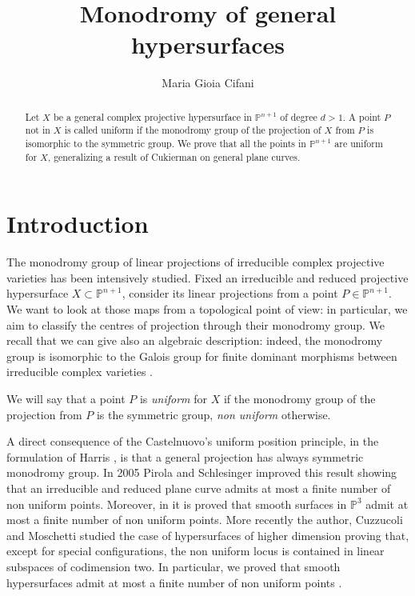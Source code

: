 \documentclass[12pt,a4paper,twoside,leqno,noamsfonts]{amsart}
\title{Monodromy of general hypersurfaces}
\author{Maria Gioia Cifani}
\theoremstyle{definition}
\newcommand{\bP}{\mathbb{P}}
\begin{document}
\begin{abstract}
Let $X$ be a general complex projective hypersurface in $\bP^{n+1}$ of degree $d>1$. A point $P$ not in $X$ is called uniform if the monodromy group of the projection of $X$ from $P$ is isomorphic to the symmetric group. We prove that all the points in $\bP^{n+1}$ are uniform for $X$, generalizing a result of Cukierman on general plane curves. 
\end{abstract}
\maketitle

\section{Introduction}
The monodromy group of linear projections of irreducible complex projective varieties has been intensively studied. Fixed an irreducible and reduced projective hypersurface $X \subset \bP^{n+1}$, consider its linear projections from a point $P \in \bP^{n+1}$. We want to look at those maps from a topological point of view: in particular, we aim to classify the centres of projection through their monodromy group. We recall that we can give also an algebraic description: indeed, the monodromy group is isomorphic to the Galois group for finite dominant morphisms between irreducible complex varieties \cite[Section I]{H}.

We will say that a point $P$ is \emph{uniform} for $X$ if the monodromy group of the projection from $P$ is the symmetric group, \emph{non uniform} otherwise.
 
A direct consequence of the Castelnuovo's uniform position principle, in the formulation of Harris \cite{JHCurves}, is that a general projection has always symmetric monodromy group. In 2005 Pirola and Schlesinger \cite{PS} improved this result showing that an irreducible and reduced plane curve admits at most a finite number of non uniform points. Moreover, in \cite{CMS} it is proved that smooth surfaces in $\bP^3$ admit at most a finite number of non uniform points. More recently the author, Cuzzucoli and Moschetti \cite{CCM} studied the case of hypersurfaces of higher dimension proving that, except for special configurations, the non uniform locus is contained in linear subspaces of codimension two. In particular, we proved that smooth hypersurfaces admit at most a finite number of non uniform points \cite[Theorem 1.3]{CCM}. 
\end{document}

